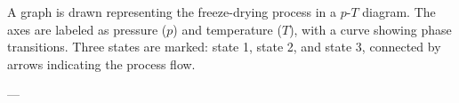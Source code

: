 A graph is drawn representing the freeze-drying process in a \( p \)-\( T \) diagram. The axes are labeled as pressure (\( p \)) and temperature (\( T \)), with a curve showing phase transitions. Three states are marked: state 1, state 2, and state 3, connected by arrows indicating the process flow.

---